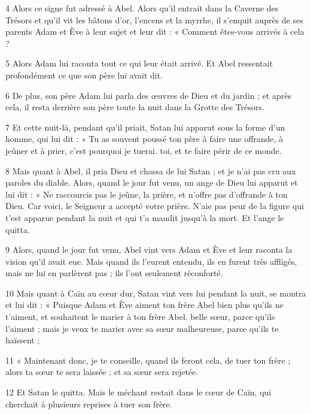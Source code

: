 \par 4 Alors ce signe fut adressé à Abel. Alors qu'il entrait dans la Caverne des Trésors et qu'il vit les bâtons d'or, l'encens et la myrrhe, il s'enquit auprès de ses parents Adam et Ève à leur sujet et leur dit : « Comment êtes-vous arrivés à cela ?

\par 5 Alors Adam lui raconta tout ce qui leur était arrivé. Et Abel ressentait profondément ce que son père lui avait dit.

\par 6 De plus, son père Adam lui parla des œuvres de Dieu et du jardin ; et après cela, il resta derrière son père toute la nuit dans la Grotte des Trésors.

\par 7 Et cette nuit-là, pendant qu'il priait, Satan lui apparut sous la forme d'un homme, qui lui dit : « Tu as souvent poussé ton père à faire une offrande, à jeûner et à prier, c'est pourquoi je tuerai. toi, et te faire périr de ce monde.

\par 8 Mais quant à Abel, il pria Dieu et chassa de lui Satan ; et je n'ai pas cru aux paroles du diable. Alors, quand le jour fut venu, un ange de Dieu lui apparut et lui dit : « Ne raccourcis pas le jeûne, la prière, et n'offre pas d'offrande à ton Dieu. Car voici, le Seigneur a accepté votre prière. N'aie pas peur de la figure qui t'est apparue pendant la nuit et qui t'a maudit jusqu'à la mort. Et l'ange le quitta.

\par 9 Alors, quand le jour fut venu, Abel vint vers Adam et Ève et leur raconta la vision qu'il avait eue. Mais quand ils l'eurent entendu, ils en furent très affligés, mais ne lui en parlèrent pas ; ils l'ont seulement réconforté.

\par 10 Mais quant à Caïn au cœur dur, Satan vint vers lui pendant la nuit, se montra et lui dit : « Puisque Adam et Ève aiment ton frère Abel bien plus qu'ils ne t'aiment, et souhaitent le marier à ton frère Abel. belle sœur, parce qu'ils l'aiment ; mais je veux te marier avec sa sœur malheureuse, parce qu'ils te haïssent ;

\par 11 « Maintenant donc, je te conseille, quand ils feront cela, de tuer ton frère ; alors ta sœur te sera laissée ; et sa sœur sera rejetée.

\par 12 Et Satan le quitta. Mais le méchant restait dans le cœur de Caïn, qui cherchait à plusieurs reprises à tuer son frère.



